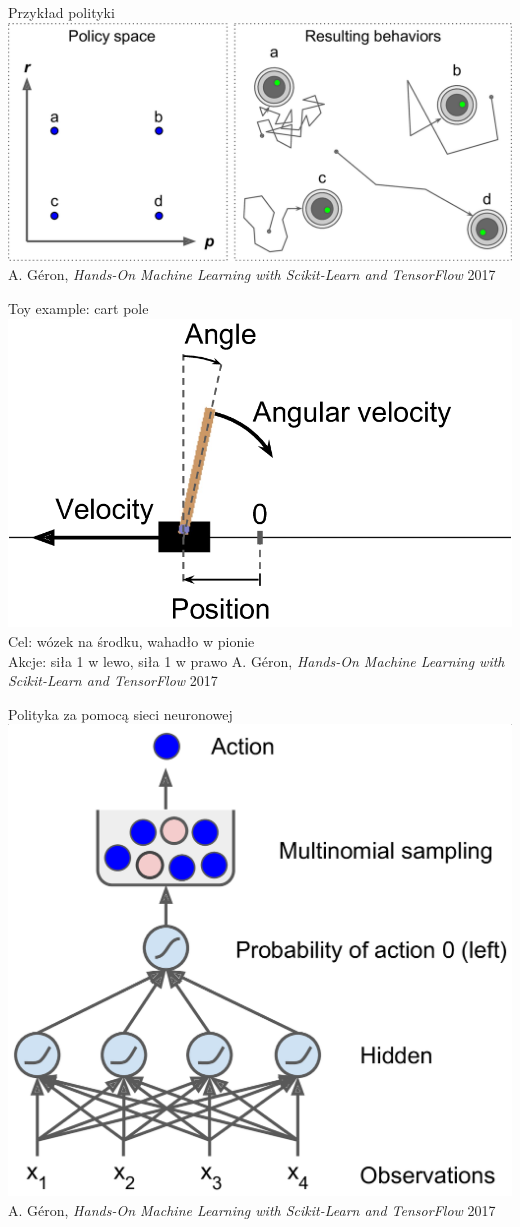 \documentclass{sa}
\begin{document}
\begin{frame}{Przykład polityki}
\centering
\includegraphics[width=\textwidth]{mlst_1603.png}
{\vfill\footnotesize A. Géron, \emph{Hands-On Machine Learning with Scikit-Learn and TensorFlow} 2017}
\end{frame}

\begin{frame}{Toy example: cart pole}
\centering
\includegraphics[width=.8\textwidth]{mlst_1604.png}\\
\pause
\alert{Cel:} wózek na środku, wahadło w pionie \\
\pause
\alert{Akcje:} siła 1 w lewo, siła 1 w prawo
{\vfill\footnotesize A. Géron, \emph{Hands-On Machine Learning with Scikit-Learn and TensorFlow} 2017}
\end{frame}

\begin{frame}{Polityka za pomocą sieci neuronowej}
\centering
\includegraphics[width=.6\textwidth]{mlst_1605.png}
{\vfill\footnotesize A. Géron, \emph{Hands-On Machine Learning with Scikit-Learn and TensorFlow} 2017}
\end{frame}
\end{document}
